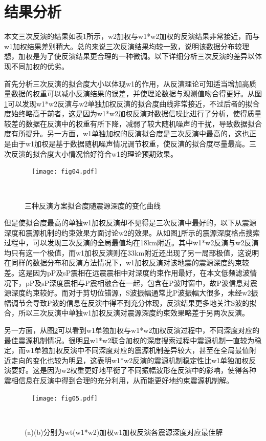 \section{结果分析}
本文三次反演的结果如表1所示，w2加权与w1*w2加权的反演结果非常接近，而与w1加权结果差别稍大。总的来说三次反演结果均较一致，说明该数据分布较理想，加权是为了使反演结果更合理的一种微调。以下详细分析三次反演的差异以体现不同加权的优劣。

首先分析三次反演的拟合度大小以体现w1的作用，从反演理论可知适当增加高质量数据的权重可以减小反演结果的误差，并使理论数据与观测值吻合得更好。从图\ref{fig04}可以发现w1*w2反演与w2单独加权反演的拟合度曲线非常接近，不过后者的拟合度始终略高于前者，这是因为w1*w2加权反演对数据信噪比进行了分析，使得质量较差的数据在反演中的权重有所下降，减弱了较大随机噪声的干扰，导致数据拟合度有所提升。另一方面，w1单独加权的反演拟合度是三次反演中最高的，这也正是由于w1加权是基于数据随机噪声情况调节权重，使反演的拟合度尽量最高。三次反演的拟合度大小情况恰好符合w1的理论预期效果。
\begin{figure}
\centering
  \texttt{[image: fig04.pdf]}
  \caption{三种反演方案拟合度随震源深度的变化曲线}
  \label{fig04}
\end{figure}

但是使拟合度最高的单独w1加权反演却不见得是三次反演中最好的，以下从震源深度和震源机制的约束效果方面讨论w2的效果。从如图\ref{fig04}所示的震源深度格点搜索过程中，可以发现三次反演的全局最值均在18km附近。其中w1*w2反演与w2反演均只有这一个极值，而w1加权反演则在33km附近还出现了另一局部极值，这说明在同样的数据分布和反演方法情况下，w1加权反演对该地震的震源深度约束较差。这是因为pP及sP震相在远震震相中对深度约束作用最好，在本文低频滤波情况下，pP及sP深度震相与P震相融合在一起，包含在P波时窗中，故P波信息对震源深度约束较好。而对于剪切位错源，S波振幅通常比P波振幅大很多，未经w2振幅调节会导致P波的信息在反演中得不到充分体现，反演结果更多地关注S波的拟合，所以三次反演中单独w1加权反演对震源深度约束效果略差于另两次反演。

另一方面，从图\ref{fig05}可以看到w1单独加权与w1*w2加权反演过程中，不同深度对应的最佳震源机制情况。很明显w1*w2联合加权的深度搜索过程中震源机制一直较为稳定，而w1单独加权反演中不同深度对应的震源机制差异较大，甚至在全局最值附近走向的变化也较为明显，这表明w1*w2反演的震源机制稳定性比w1单独加权反演要好。这是因为w2权重更好地平衡了不同振幅波形在反演中的影响，使得各种震相信息在反演中得到合理的充分利用，从而能更好地约束震源机制解。
\begin{figure}
\centering
  \texttt{[image: fig05.pdf]}
  \caption{ (a)(b)分别为wt(w1*w2)加权w1加权反演各震源深度对应最佳解}
  \label{fig05}
\end{figure}

